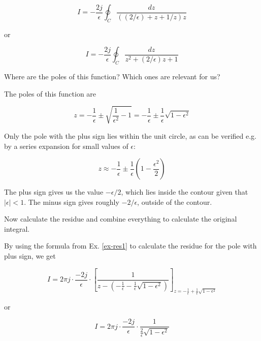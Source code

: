 \begin{equation}
  I = -\frac{2j}{\epsilon} \oint_{{C}} \frac{dz}{\left((2 / \epsilon) + z +
  1/z \right) z}
\end{equation} 

or

\begin{equation}
I = -\frac{2j}{\epsilon} \oint_{{C}} \frac{dz}{z^2 + (2 / \epsilon)z +
1}
\end{equation} 

\begin{cue}
  Where are the poles of this function? Which ones are relevant for us?
\end{cue}

The poles of this function are

\begin{equation}
z = - \frac{1}{\epsilon} \pm \sqrt{ \frac{1}{\epsilon^2} - 1} = - \frac{1}{\epsilon} \pm \frac{1}{\epsilon} \sqrt{1 - \epsilon^2}
\end{equation} 

Only the pole with the plus sign lies within the unit circle, as can be verified e.g. by a series expansion for small values of $\epsilon$:

\begin{equation}
z \approx - \frac{1}{\epsilon} \pm  \frac{1}{\epsilon} \left(1 - \frac{\epsilon^2}{2} \right)
\end{equation} 

The plus sign gives us the value $-\epsilon / 2$, which lies inside the contour given that $|\epsilon| < 1$. The minus sign gives roughly $-2/\epsilon$, outside of the contour.

\begin{cue}
Now calculate the residue and combine everything to calculate the original integral.
\end{cue}

By using the formula from Ex. \ref{ex-res1} to calculate the residue for the pole with plus sign, we get

\begin{equation}
I = 2 \pi j \cdot \frac{-2j}{\epsilon} \cdot \left[\frac{1}{z - (-\frac{1}{\epsilon} -
\frac{1}{\epsilon} \sqrt{1 - \epsilon^2})}\right]_{z = - \frac{1}{\epsilon} +
\frac{1}{\epsilon} \sqrt{1 - \epsilon^2}}
\end{equation}

or

\begin{equation}
I = 2 \pi j \cdot \frac{-2j}{\epsilon} \cdot \frac{1}{\frac{2}{\epsilon} \sqrt{1
- \epsilon^2}}
\end{equation}

